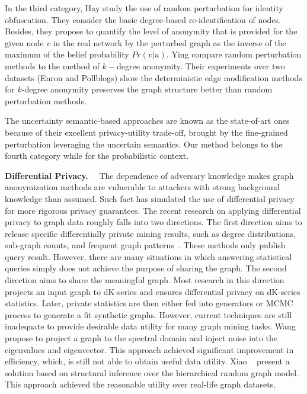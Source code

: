 In the third category, Hay {\etal} \cite{Liu_Privacy_2009} study the use of random perturbation for identity obfuscation. They consider the basic degree-based re-identification of nodes. Besides, they propose to quantify the level of anonymity that is provided for the given node $v$ in the real network by the perturbed graph as the inverse of the maximum of the belief probability $Pr(v|u)$. Ying {\etal} \cite{Ying_Randomizing_2008} compare random perturbation methods to the method of $k-$degree anonymity. Their experiments over two datasets (Enron and Pollblogs) show the deterministic edge modification methods for $k$-degree anonymity preserves the graph structure better than random perturbation methods.

The uncertainty semantic-based approaches are known as the state-of-art ones because of their excellent privacy-utility trade-off, brought by the fine-grained perturbation leveraging the uncertain semantics. 
Our method belongs to the fourth category while for the probabilistic context. 

 
\textbf{Differential Privacy.}~~
The dependence of adversary knowledge makes graph anonymization methods are vulnerable to attackers with strong background knowledge than assumed. Such fact has simulated the use of differential privacy for more rigorous privacy guarantees. 
The recent research on applying differential privacy to graph data roughly falls into two directions. The first direction aims to release specific differentially private mining results, such as degree distributions, sub-graph counts, and frequent graph patterns~\cite{Xiao_Differentially_2014, Day:2016}. These methods only publish query result. However, there are many situations in which answering statistical queries simply does not achieve the purpose of sharing the graph.  
The second direction aims to share the meaningful graph. Most research in this direction~\cite{Sala_Sharing_2011,Proserpio_2012} projects an input graph to dK-series and ensures differential privacy on dK-series statistics. Later, private statistics are then either fed into generators or MCMC process to generate a fit synthetic graphs. However, current techniques are still inadequate to provide desirable data utility for many graph mining tasks. Wang {\etal}~\cite{Wang_2013} propose to project a graph to the spectral domain and inject noise into the eigenvalues and eigenvector. This approach achieved significant improvement in efficiency, which, is still not able to obtain useful data utility. Xiao {\etal}~\cite{Xiao_Differentially_2014} present a solution based on structural inference over the hierarchical random graph model. This approach achieved the reasonable utility over real-life graph datasets. 

